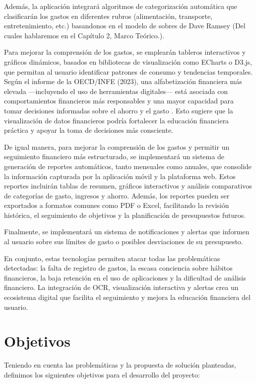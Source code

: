 Además, la aplicación integrará algoritmos de categorización automática que clasificarán los gastos en diferentes rubros (alimentación, transporte, entretenimiento, etc.) basandonos en el modelo de sobres de Dave Ramsey (Del cuales hablaremos en el Capítulo 2, Marco Teórico.). 

Para mejorar la comprensión de los gastos, se emplearán tableros interactivos y gráficos dinámicos, basados en bibliotecas de visualización como ECharts o D3.js, que permitan al usuario identificar patrones de consumo y tendencias temporales. Según el informe de la OECD/INFE (2023), una alfabetización financiera más elevada —incluyendo el uso de herramientas digitales— está asociada con comportamientos financieros más responsables y una mayor capacidad para tomar decisiones informadas sobre el ahorro y el gasto \cite{OECD_INFE2023}. 
Esto sugiere que la visualización de datos financieros podría fortalecer la educación financiera práctica y apoyar la toma de decisiones más consciente.

De igual manera, para mejorar la comprensión de los gastos y permitir un seguimiento financiero más estructurado, se implementará un sistema de generación de reportes 
automáticos, tanto mensuales como anuales, que consolide la información capturada por la aplicación móvil y la plataforma web. Estos reportes incluirán tablas de resumen, 
gráficos interactivos y análisis comparativos de categorías de gasto, ingresos y ahorro. Además, los reportes pueden ser exportados a formatos comunes como PDF o Excel, 
facilitando la revisión histórica, el seguimiento de objetivos y la planificación de presupuestos futuros. 

Finalmente, se implementará un sistema de notificaciones y alertas que informen al usuario sobre sus límites de gasto o posibles desviaciones de su presupuesto. 

En conjunto, estas tecnologías permiten atacar todas las problemáticas detectadas: la falta de registro de gastos, la escasa conciencia sobre hábitos financieros, la baja 
retención en el uso de aplicaciones y la dificultad de análisis financiero. La integración de OCR, visualización interactiva y alertas crea un ecosistema digital 
que facilita el seguimiento y mejora la educación financiera del usuario. 

 
\section{Objetivos}
Teniendo en cuenta las problemáticas y la propuesta de solución planteadas, definimos los siguientes objetivos para el desarrollo del proyecto:

